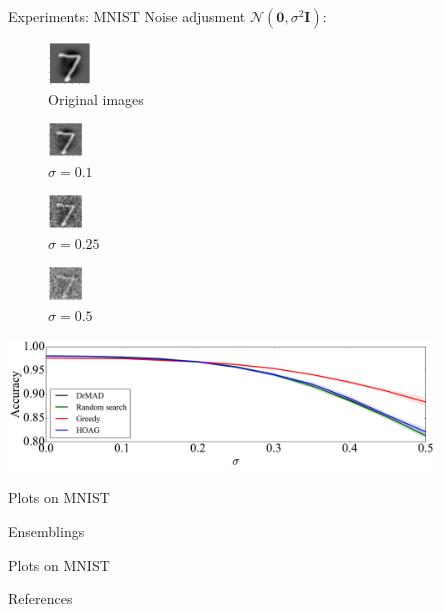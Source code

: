 \documentclass[usenames,dvipsnames,11pt,pdf,utf8,russian,aspectratio=169]{beamer}
\begin{document}
\begin{frame}{Experiments: MNIST}
Noise adjusment $\mathcal{N}(\mathbf{0},\sigma^2\mathbf{I})$:
\setlength{\columnsep}{10pt}
\begin{multicols}{4}
\begin{figure}[h]
\includegraphics[width=0.10\textwidth]{./mnist0.png}
\caption*{Original images}
\end{figure}

\begin{figure}[h]
\includegraphics[width=0.08\textwidth]{./mnist10.png}
\caption*{$\sigma=0.1$}
\end{figure}

\begin{figure}[h]
\includegraphics[width=0.08\textwidth]{./mnist25.png}
\caption*{$\sigma=0.25$}
\end{figure}

\begin{figure}[h]
\includegraphics[width=0.08\textwidth]{./mnist50.png}
\caption*{$\sigma=0.5$}
\end{figure}
\end{multicols}
\begin{center}
\includegraphics[width=0.85\textwidth]{Fig_noise.pdf}
\end{center}
\end{frame}


\begin{frame}
Plots on MNIST
\end{frame}


\begin{frame}
Ensemblings
\end{frame}


\begin{frame}
Plots on MNIST
\end{frame}






\begin{frame}{References}
\end{frame}
\end{document}
